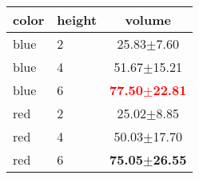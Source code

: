 \begin{tabular}{llc} 
color & height & volume \\ 
\hline 
blue & 2 &  25.83$\pm$7.60 \\ 
blue & 4 & 51.67$\pm$15.21 \\ 
blue & 6 & \textbf{\textcolor{red}{77.50$\pm$22.81}} \\ 
red & 2 &  25.02$\pm$8.85 \\ 
red & 4 & 50.03$\pm$17.70 \\ 
red & 6 & \textbf{75.05$\pm$26.55} \\ 
\end{tabular} 
